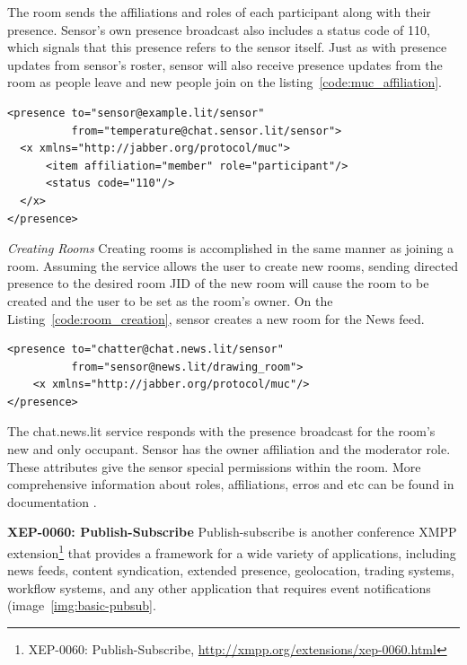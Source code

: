 The room sends the affiliations and roles of each participant along with their presence. Sensor's own presence broadcast also includes a status code of 110, which signals that this presence refers to the sensor itself. Just as with presence updates from sensor's roster, sensor will also receive presence updates from the room as people leave and new people join on the listing~\ref{code:muc_affiliation}.
\begin{lstlisting}[label=code:muc_affiliation,caption=Server Presence Notification]
<presence to="sensor@example.lit/sensor"
          from="temperature@chat.sensor.lit/sensor">
  <x xmlns="http://jabber.org/protocol/muc">
      <item affiliation="member" role="participant"/>
      <status code="110"/>
  </x>
</presence>
\end{lstlisting}

\emph{Creating Rooms}
\newline
Creating rooms is accomplished in the same manner as joining a room. Assuming the service allows the user to create new rooms, sending directed presence to the desired room JID of the new room will cause the room to be created and the user to be set as the room’s owner. On the Listing~\ref{code:room_creation}, sensor creates a new room for the News feed.

	\begin{lstlisting}[label=code:room_creation,caption=MUC Room Creation]
<presence to="chatter@chat.news.lit/sensor"
          from="sensor@news.lit/drawing_room">
    <x xmlns="http://jabber.org/protocol/muc"/>
</presence>
	\end{lstlisting}

The chat.news.lit service responds with the presence broadcast for the room’s new and only occupant.
Sensor has the owner affiliation and the moderator role. These attributes give the sensor special permissions within the room. More comprehensive information about roles, affiliations, erros and etc can be found in documentation \cite{XMPPbook}.

\textbf{XEP-0060: Publish-Subscribe}
\newline
Publish-subscribe is another conference XMPP extension\footnote{XEP-0060: Publish-Subscribe, \url{http://xmpp.org/extensions/xep-0060.html}} that provides a framework for a wide variety of applications, including news feeds, content syndication, extended presence, geolocation, trading systems, workflow systems, and any other application that requires event notifications (image~\ref{img:basic-pubsub}.


